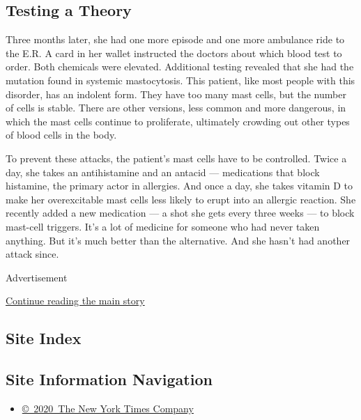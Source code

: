 \hypertarget{testing-a-theory}{%
\subsection{\texorpdfstring{\textbf{Testing a
Theory}}{Testing a Theory}}\label{testing-a-theory}}

Three months later, she had one more episode and one more ambulance ride
to the E.R. A card in her wallet instructed the doctors about which
blood test to order. Both chemicals were elevated. Additional testing
revealed that she had the mutation found in systemic mastocytosis. This
patient, like most people with this disorder, has an indolent form. They
have too many mast cells, but the number of cells is stable. There are
other versions, less common and more dangerous, in which the mast cells
continue to proliferate, ultimately crowding out other types of blood
cells in the body.

To prevent these attacks, the patient's mast cells have to be
controlled. Twice a day, she takes an antihistamine and an antacid ---
medications that block histamine, the primary actor in allergies. And
once a day, she takes vitamin D to make her overexcitable mast cells
less likely to erupt into an allergic reaction. She recently added a new
medication --- a shot she gets every three weeks --- to block mast-cell
triggers. It's a lot of medicine for someone who had never taken
anything. But it's much better than the alternative. And she hasn't had
another attack since.

Advertisement

\protect\hyperlink{after-bottom}{Continue reading the main story}

\hypertarget{site-index}{%
\subsection{Site Index}\label{site-index}}

\hypertarget{site-information-navigation}{%
\subsection{Site Information
Navigation}\label{site-information-navigation}}

\begin{itemize}
\tightlist
\item
  \href{https://help.nytimes3xbfgragh.onion/hc/en-us/articles/115014792127-Copyright-notice}{©~2020~The
  New York Times Company}
\end{itemize}


